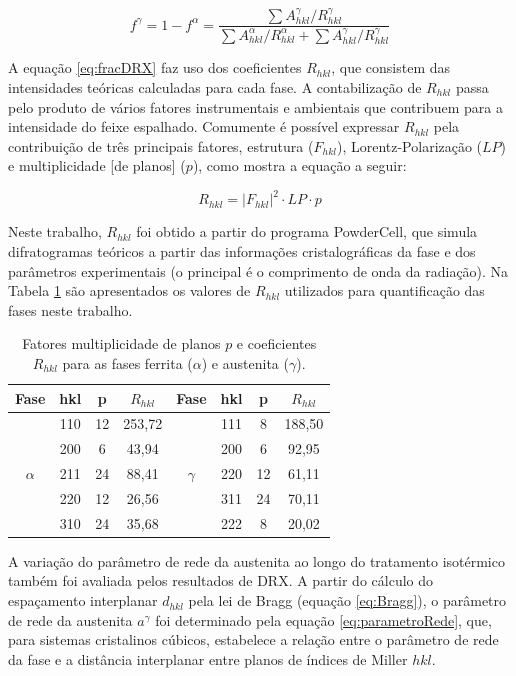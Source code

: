 \begin{equation}
  f^\gamma = 1 - f^\alpha = \frac{\sum A_{hkl}^\gamma/R_{hkl}^\gamma}{\sum A_{hkl}^\alpha/R_{hkl}^\alpha + \sum A_{hkl}^\gamma/R_{hkl}^\gamma}
  \label{eq:fracDRX}
\end{equation}

A equação \ref{eq:fracDRX} faz uso dos coeficientes $R_{hkl}$, que consistem das intensidades teóricas calculadas para cada fase. A contabilização de $R_{hkl}$ passa pelo produto de vários fatores instrumentais e ambientais que contribuem para a intensidade do feixe espalhado. Comumente é possível expressar $R_{hkl}$ pela contribuição de três principais fatores, estrutura ($F_{hkl}$), Lorentz-Polarização ($LP$) e multiplicidade [de planos] ($p$), como mostra a equação a seguir:

\begin{equation}
  R_{hkl} = \left| F_{hkl} \right|^2 \cdot LP \cdot p
  \label{eq:Rhkl}
\end{equation}

Neste trabalho, $R_{hkl}$ foi obtido a partir do programa  PowderCell, que simula difratogramas teóricos a partir das informações cristalográficas da fase e dos parâmetros experimentais (o principal é o comprimento de onda da radiação). Na Tabela \ref{tab:fatoresR} são apresentados os valores de $R_{hkl}$ utilizados para quantificação das fases neste trabalho.

\begin{table} %
  \caption{Fatores multiplicidade de planos $p$ e coeficientes $R_{hkl}$ para as fases ferrita ($\alpha$) e austenita ($\gamma$).}
  \begin{tabular}{c c c c | c c c c}
  \hline
  Fase & hkl & p & $R_{hkl}$ & Fase & hkl & p & $R_{hkl}$\\
  \hline
  & 110 & 12 & 253,72 & & 111 & 8 & 188,50\\
  & 200 & 6 & 43,94 & & 200 & 6 & 92,95\\
  $\alpha$ & 211 & 24 & 88,41 & $\gamma$ & 220 & 12 & 61,11\\
  & 220 & 12 & 26,56 & & 311 & 24 & 70,11\\
  & 310 & 24 & 35,68 & & 222 & 8 & 20,02\\
  \hline
  \end{tabular}
  \label{tab:fatoresR}
\end{table}

A variação do parâmetro de rede da austenita ao longo do tratamento isotérmico também foi avaliada pelos resultados de DRX. A partir do cálculo do espaçamento interplanar $d_{hkl}$ pela lei de Bragg (equação \ref{eq:Bragg}), o parâmetro de rede da austenita $a^\gamma$ foi determinado pela equação \ref{eq:parametroRede}, que, para sistemas cristalinos cúbicos, estabelece a relação entre o parâmetro de rede da fase e a distância interplanar entre planos de índices de Miller $hkl$.

